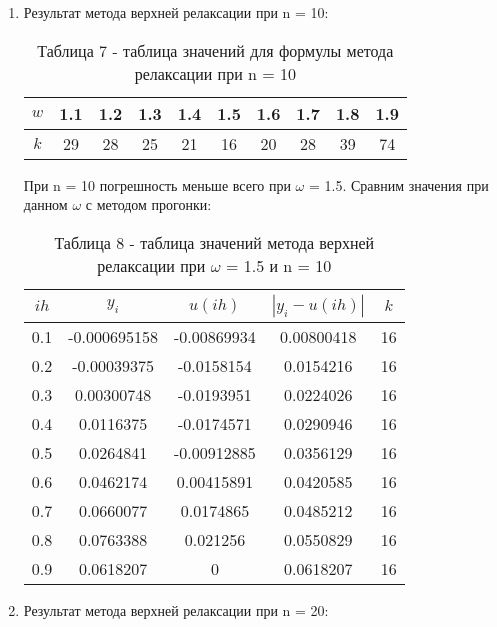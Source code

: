 \documentclass[a4paper,12pt]{article}
\begin{document}
\begin{enumerate}[label = \arabic*.]
  \item {Результат метода верхней релаксации при n = 10:
      \begin{table}[h]
        \centering
        \begin{tabular}{|c|c|c|c|c|c|c|c|c|c|}
          \hline
          $w$ & 1.1 & 1.2 & 1.3 & 1.4 & 1.5 & 1.6 & 1.7 & 1.8 & 1.9\\ \hline
          $k$ & 29 & 28 & 25 & 21 & 16 & 20 & 28 & 39 & 74\\ \hline
        \end{tabular}
        \caption*{\small{Таблица 7 - таблица значений для формулы метода релаксации при n = 10}}
      \end{table}

  \hspace{0.5cm} При n = 10 погрешность меньше всего при $\omega$ = 1.5. 
  Сравним значения при данном $\omega$ с методом прогонки:
  \begin{table}[h]
    \centering
    \begin{tabular}{|c|c|c|c|c|}
      \hline
      $ih$ & $y_i$ & $u(ih)$ & $\left|y_i-u(ih)\right|$ & $k$ \\ \hline
      0.1 & -0.000695158 &  -0.00869934 &   0.00800418 & 16\\ \hline
      0.2 &  -0.00039375 &   -0.0158154 &    0.0154216 & 16\\ \hline
      0.3 &   0.00300748 &   -0.0193951 &    0.0224026 & 16\\ \hline
      0.4 &    0.0116375 &   -0.0174571 &    0.0290946 & 16\\ \hline
      0.5 &    0.0264841 &  -0.00912885 &    0.0356129 & 16\\ \hline
      0.6 &    0.0462174 &   0.00415891 &    0.0420585 & 16\\ \hline
      0.7 &    0.0660077 &    0.0174865 &    0.0485212 & 16\\ \hline
      0.8 &    0.0763388 &     0.021256 &    0.0550829 & 16\\ \hline
      0.9 &    0.0618207 &            0 &    0.0618207 & 16\\ \hline
    \end{tabular}
    \caption*{\small{Таблица 8 - таблица значений метода верхней релаксации при $\omega$ = 1.5 и n = 10}}
  \end{table}
  }
  \item {Результат метода верхней релаксации при n = 20:
    \begin{table}[h]

\end{table}}
\end{enumerate}
\end{document}

